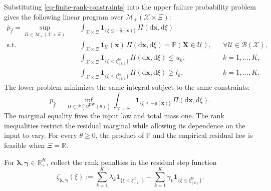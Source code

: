 \documentclass[review,11pt,3p,authoryear,nopreprintline]{elsarticle}
\begin{document}
Substituting \eqref{eq-finite-rank-constraints} into the upper failure probability problem gives the following linear program over $\mathcal M_+(\mathcal X\times\Xi)$:
\begin{equation}
  \begin{aligned}
    \overline p_{\hat f}
    =\sup_{\Pi\in\mathcal M_+(\mathcal X\times\Xi)}\quad&
      \int_{\mathcal X\times\Xi}
      \mathbf1_{\{\xi\le -\hat g(\bm x)\}}\,\Pi(\mathrm d\bm x,\mathrm d\xi)\\
    \text{s.t.}\quad&
      \int_{\mathcal X\times\Xi}
      \mathbf1_{\mathcal U}(\bm x)\,\Pi(\mathrm d\bm x,\mathrm d\xi)
      =\mathbb P(\bm X\in\mathcal U),
      &&\forall \mathcal U\in\mathcal B(\mathcal X),\\
    &\int_{\mathcal X\times\Xi}
      \mathbf1_{\{\xi<\xi_{(k)}^{\mathrm{te}}\}}\,\Pi(\mathrm d\bm x,\mathrm d\xi)\le u_k,
      &&k=1,\ldots,K,\\
    &\int_{\mathcal X\times\Xi}
      \mathbf1_{\{\xi\le \xi_{(k)}^{\mathrm{te}}\}}\,\Pi(\mathrm d\bm x,\mathrm d\xi)\ge l_k,
      &&k=1,\ldots,K.
  \end{aligned}
  \label{eq-measure-upper}
\end{equation}
The lower problem minimizes the same integral subject to the same constraints:
\begin{equation*}
  \underline p_{\hat f}
  =\inf_{\Pi\in\mathcal P(\mathcal Q^{\mathrm{DW}}(\theta))}
    \int_{\mathcal X\times\Xi}
    \mathbf1_{\{\xi\le -\hat g(\bm x)\}}\,\Pi(\mathrm d\bm x,\mathrm d\xi).
\end{equation*}
The marginal equality fixes the input law and total mass one. The rank inequalities restrict the residual marginal while allowing its dependence on the input to vary. For every $\theta\ge0$, the product of $\mathbb P$ and the empirical residual law is feasible when $\Xi=\mathbb R$.

For $\bm\lambda,\bm\gamma\in\mathbb R_+^K$, collect the rank penalties in the residual step function
\begin{equation*}
  \zeta_{\bm\lambda,\bm\gamma}(\xi)
  :=\sum_{k=1}^K\lambda_k\mathbf1_{\{\xi<\xi_{(k)}^{\mathrm{te}}\}}
    -\sum_{k=1}^K\gamma_k\mathbf1_{\{\xi\le\xi_{(k)}^{\mathrm{te}}\}}.
\end{equation*}
\end{document}
